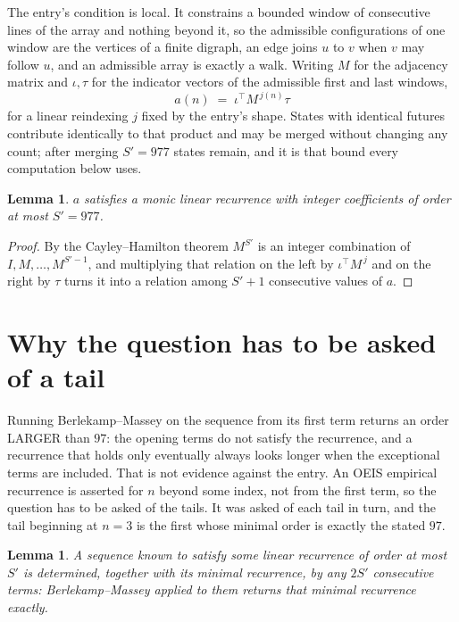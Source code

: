 \documentclass[11pt,a4paper]{article}
\theoremstyle{plain}
\newtheorem{lemma}[theorem]{Lemma}
\theoremstyle{definition}
\begin{document}
The entry's condition is local. It constrains a bounded window of consecutive lines of the
array and nothing beyond it, so the admissible configurations of one window are the vertices of
a finite digraph, an edge joins $u$ to $v$ when $v$ may follow $u$, and an admissible array is
exactly a walk. Writing $M$ for the adjacency matrix and $\iota,\tau$ for the indicator vectors
of the admissible first and last windows,
\[
a(n)\;=\;\iota^{\!\top}M^{\,j(n)}\tau
\]
for a linear reindexing $j$ fixed by the entry's shape. States with identical futures
contribute identically to that product and may be merged without changing any count; after
merging $S'=977$ states remain, and it is that bound every computation below uses.

\begin{lemma}\label{lem:cf}
$a$ satisfies a monic linear recurrence with integer coefficients of order at most $S'=977$.
\end{lemma}

\begin{proof}
By the Cayley--Hamilton theorem $M^{S'}$ is an integer combination of $I,M,\dots,M^{S'-1}$,
and multiplying that relation on the left by $\iota^{\!\top}M^{\,j}$ and on the right by
$\tau$ turns it into a relation among $S'+1$ consecutive values of $a$.
\end{proof}

\section{Why the question has to be asked of a tail}

Running Berlekamp--Massey on the sequence from its first term returns an order LARGER than $97$: the opening terms do not satisfy the recurrence, and a recurrence that holds only eventually always looks longer when the exceptional terms are included. That is not evidence against the entry. An OEIS empirical recurrence is asserted for $n$ beyond some index, not from the first term, so the question has to be asked of the tails. It was asked of each tail in turn, and the tail beginning at $n=3$ is the first whose minimal order is exactly the stated $97$.

\begin{lemma}\label{lem:bm}
A sequence known to satisfy some linear recurrence of order at most $S'$ is determined,
together with its minimal recurrence, by any $2S'$ consecutive terms: Berlekamp--Massey applied
to them returns that minimal recurrence exactly.
\end{lemma}
\end{document}
